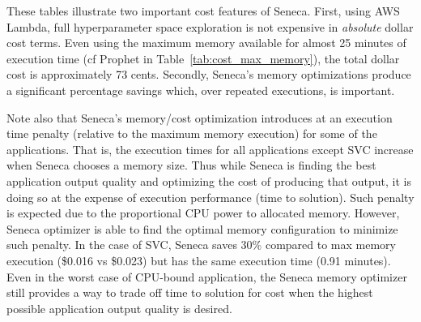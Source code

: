 These tables illustrate two important cost features of Seneca.  First, using
AWS Lambda, full hyperparameter space exploration is not expensive in 
\textit{absolute} dollar cost terms.  Even using the maximum memory available
for almost 25 minutes of execution time (cf Prophet in Table~\ref{tab:cost_max_memory}), the
total dollar cost is approximately 73 cents.  Secondly, Seneca's memory
optimizations produce a significant percentage savings which, over repeated
executions, is important.  

Note also that Seneca's memory/cost optimization
introduces at an execution time penalty (relative to the maximum memory
execution) for some of the applications.  That is, the
execution times for all applications except SVC increase when Seneca chooses
a memory size.  Thus while Seneca is finding the best application output
quality and optimizing the cost of producing that output, it is doing so at
the expense of execution performance (time to solution). Such penalty is expected due to the proportional CPU power to allocated memory. However, Seneca optimizer is able to find the optimal memory configuration to minimize such penalty. In the case of SVC, Seneca saves 30\% compared to max memory execution (\$0.016 vs \$0.023) but has the same execution time (0.91 minutes).
Even in the worst case of CPU-bound application, the Seneca memory optimizer still provides a way to trade off time to solution for cost when the highest possible application output quality is desired.





